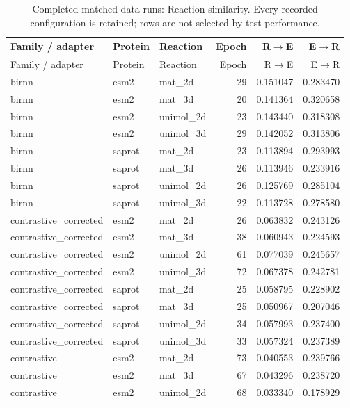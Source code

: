 \begin{longtable}{p{.32\linewidth}llrrr}
\caption{Completed matched-data runs: Reaction similarity. Every recorded configuration is retained; rows are not selected by test performance.}\label{tab:exp-all-reaction-smi}\\
\toprule
Family / adapter & Protein & Reaction & Epoch & R$\to$E & E$\to$R \\
\midrule\endfirsthead
\toprule
Family / adapter & Protein & Reaction & Epoch & R$\to$E & E$\to$R \\
\midrule\endhead
\bottomrule\endfoot
birnn & esm2 & mat\_2d & 29 & 0.151047 & 0.283470 \\
birnn & esm2 & mat\_3d & 20 & 0.141364 & 0.320658 \\
birnn & esm2 & unimol\_2d & 23 & 0.143440 & 0.318308 \\
birnn & esm2 & unimol\_3d & 29 & 0.142052 & 0.313806 \\
birnn & saprot & mat\_2d & 23 & 0.113894 & 0.293993 \\
birnn & saprot & mat\_3d & 26 & 0.113946 & 0.233916 \\
birnn & saprot & unimol\_2d & 26 & 0.125769 & 0.285104 \\
birnn & saprot & unimol\_3d & 22 & 0.113728 & 0.278580 \\
contrastive\_corrected & esm2 & mat\_2d & 26 & 0.063832 & 0.243126 \\
contrastive\_corrected & esm2 & mat\_3d & 38 & 0.060943 & 0.224593 \\
contrastive\_corrected & esm2 & unimol\_2d & 61 & 0.077039 & 0.245657 \\
contrastive\_corrected & esm2 & unimol\_3d & 72 & 0.067378 & 0.242781 \\
contrastive\_corrected & saprot & mat\_2d & 25 & 0.058795 & 0.228902 \\
contrastive\_corrected & saprot & mat\_3d & 25 & 0.050967 & 0.207046 \\
contrastive\_corrected & saprot & unimol\_2d & 34 & 0.057993 & 0.237400 \\
contrastive\_corrected & saprot & unimol\_3d & 33 & 0.057324 & 0.237389 \\
contrastive & esm2 & mat\_2d & 73 & 0.040553 & 0.239766 \\
contrastive & esm2 & mat\_3d & 67 & 0.043296 & 0.238720 \\
contrastive & esm2 & unimol\_2d & 68 & 0.033340 & 0.178929 \\

\end{longtable}
